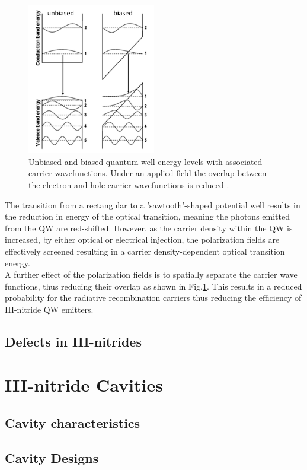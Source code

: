 \begin{figure}[h]
	\centering
	\includegraphics[width=0.5\textwidth]{Figs/Ch1/QCSE.png}
	\caption {Unbiased and biased quantum well energy levels with associated carrier wavefunctions. Under an applied field the overlap between the electron and hole carrier wavefunctions is reduced \cite{Ryou2009}.}
	\label{1.5}
\end{figure}
\FloatBarrier 

The transition from a rectangular to a 'sawtooth'-shaped potential well results in the reduction in energy of the optical transition, meaning the photons emitted from the QW are red-shifted. However, as the carrier density within the QW is increased, by either optical or electrical injection, the polarization fields are effectively screened resulting in a carrier density-dependent optical transition energy.\\
A further effect of the polarization fields is to spatially separate the carrier wave functions, thus reducing their overlap as shown in Fig.\ref{1.5}. This results in a reduced probability for the radiative recombination carriers thus reducing the efficiency of III-nitride QW emitters.
\subsection{Defects in III-nitrides}  %
\label{section1.1.4}

\section{III-nitride Cavities } %

\subsection{Cavity characteristics}

\subsection{Cavity Designs}

